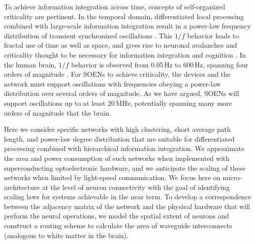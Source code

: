 \documentclass[twocolumn]{article}
\begin{document}
To achieve information integration across time, concepts of self-organized criticality \cite{bata1987,yara2017} are pertinent. In the temporal domain, differentiated local processing combined with large-scale information integration result in a power-law frequency distribution of transient synchronized oscillations \cite{budr2004,bu2006}. This $1/f$ behavior leads to fractal use of time as well as space, and gives rise to neuronal avalanches \cite{be2007} and criticality thought to be necessary for information integration and cognition \cite{be2007,kism2009,shya2009,rusp2011}. In the human brain, $1/f$ behavior is observed from 0.05\,Hz to 600\,Hz, spanning four orders of magnitude \cite{budr2004,bu2006}. For SOENs to achieve criticality, the devices and the network must support oscillations with frequencies obeying a power-law distribution \cite{bu2006} over several orders of magnitude. As we have argued, SOENs will support oscillations up to at least 20\,MHz, potentially spanning many more orders of magnitude that the brain. 

Here we consider specific networks with high clustering, short average path length, and power-law degree distribution that are suitable for differentiated processing combined with hierarchical information integration. We approximate the area and power consumption of such networks when implemented with superconducting optoelectronic hardware, and we anticipate the scaling of these networks when limited by light-speed communication. We focus here on micro-architecture at the level of neuron connectivity with the goal of identifying scaling laws for systems achievable in the near term. To develop a correspondence between the adjacency matrix of the network \cite{eskn2015} and the physical hardware that will perform the neural operations, we model the spatial extent of neurons and construct a routing scheme to calculate the area of waveguide interconnects (analogous to white matter in the brain).
	
\end{document}
